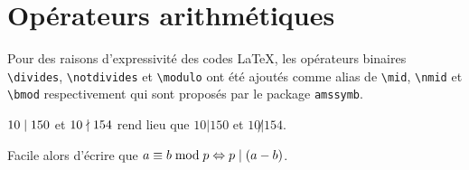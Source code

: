 \documentclass[12pt,a4paper]{article}
\begin{document}
\section{Opérateurs arithmétiques}


Pour des raisons d'expressivité des codes \LaTeX{}, les opérateurs binaires \verb+\divides+, \verb+\notdivides+ et \verb+\modulo+ ont été ajoutés comme alias de \verb+\mid+, \verb+\nmid+ et \verb+\bmod+ respectivement qui sont proposés par le package \verb+amssymb+.

\begin{tcblisting}{}
$10 \divides 150$ et $10 \notdivides 154$ rend lieu que $10 | 150$ et $10 \not| 154$.

Facile alors d'écrire que $a \equiv b \modulo p \Leftrightarrow p \divides (a - b)$.
\end{tcblisting}
\end{document}
